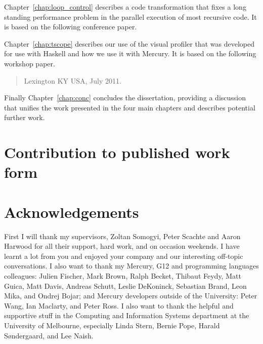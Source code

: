 \documentclass[a4paper,twoside,openright]{report}
\begin{document}
Chapter~\ref{chap:loop_control} describes a code transformation that fixes 
a long standing performance problem in the parallel execution of most
recursive code.
It is based on the following conference paper.

\begin{quote}
\end{quote}

Chapter~\ref{chap:tscope} describes our use of the \tscope visual
profiler that was developed for use with Haskell and how we use it with
Mercury.
It is based on the following workshop paper.

\begin{quote}
{Lexington KY USA, July 2011.}
\end{quote}

Finally Chapter~\ref{chap:conc} concludes the dissertation, providing a
discussion that unifies the work presented in the four main chapters and
describes potential further work.


\chapter*{Contribution to published work form}


\chapter*{Acknowledgements}


First I will thank my supervisors,
Zoltan Somogyi,
Peter Scachte and
Aaron Harwood
for all their support, hard work, and on occasion weekends.
I have learnt a lot from you and enjoyed your company and our interesting
off-topic conversations.
I also want to thank my Mercury, G12 and programming languages colleagues:
Julien Fischer,
Mark Brown,
Ralph Becket, 
Thibaut Feydy,
Matt Guica,
Matt Davis,
Andreas Schutt,
Leslie DeKoninck,
Sebastian Brand,
Leon Mika,
and
Ondrej Bojar;
and Mercury developers outside of the University:
Peter Wang,
Ian Maclarty,
and
Peter Ross.
I also want to thank the helpful and supportive stuff in the Computing and
Information Systems department at the University of Melbourne,
especially
Linda Stern,
Bernie Pope,
Harald S{\o}ndergaard, and
Lee Naish.
\end{document}
